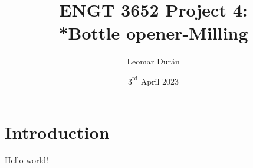 \documentclass{report}
\title{ENGT 3652 Project 4:\\*Bottle opener-Milling}
\author{Leomar Dur\'an}
\date{$3^{\text{rd}}$ April 2023}
\begin{document}
\maketitle

\chapter{Introduction}
Hello world!
\end{document}
